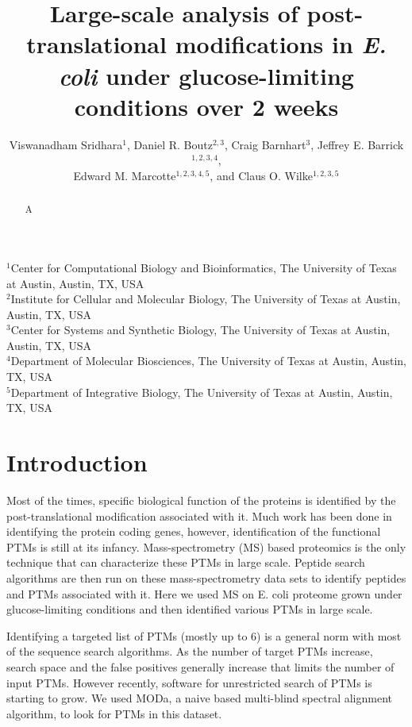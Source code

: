 \documentclass[12pt]{article}
\begin{document}
\title{Large-scale analysis of post-translational modifications in \emph{E. coli} under glucose-limiting conditions over 2 weeks}

\author{Viswanadham Sridhara$^1$, Daniel R. Boutz$^{2,3}$, Craig Barnhart$^3$, Jeffrey E. Barrick$^{1,2,3,4}$,\\
Edward M. Marcotte$^{1,2,3,4,5}$, and Claus O. Wilke$^{1,2,3,5}$}
\maketitle

\noindent
$^1$Center for Computational Biology and Bioinformatics, The University of Texas at Austin, Austin, TX, USA\\
$^2$Institute for Cellular and Molecular Biology, The University of Texas at Austin, Austin, TX, USA\\
$^3$Center for Systems and Synthetic Biology, The University of Texas at Austin, Austin, TX, USA\\
$^4$Department of Molecular Biosciences, The University of Texas at Austin, Austin, TX, USA\\
$^5$Department of Integrative Biology, The University of Texas at Austin, Austin, TX, USA\\


\begin{abstract}
A 
\end{abstract}


\section{Introduction}

Most of the times, specific biological function of the proteins is identified by the post-translational modification associated with it. Much work has been done in identifying the protein coding genes, however, identification of the functional PTMs is still at its infancy. Mass-spectrometry (MS) based proteomics is the only technique that can characterize these PTMs in large scale. Peptide search algorithms are then run on these mass-spectrometry data sets to identify peptides and PTMs associated with it. Here we used MS on E. coli proteome grown under glucose-limiting conditions and then identified various PTMs in large scale.

Identifying a targeted list of PTMs (mostly up to 6) is a general norm with most of the sequence search algorithms. As the number of target PTMs increase, search space and the false positives generally increase that limits the number of input PTMs. However recently, software for unrestricted search of PTMs is starting to grow. We used MODa, a naive based multi-blind spectral alignment algorithm, to look for PTMs in this dataset. 
\end{document}

